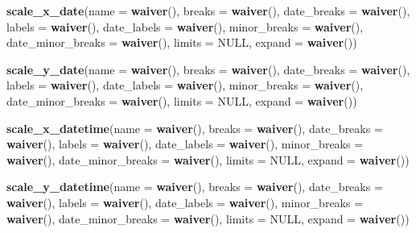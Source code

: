 \documentclass[]{book}
\newenvironment{Shaded}{\begin{snugshade}}{\end{snugshade}}
\newcommand{\KeywordTok}[1]{\textcolor[rgb]{0.13,0.29,0.53}{\textbf{#1}}}
\newcommand{\DataTypeTok}[1]{\textcolor[rgb]{0.13,0.29,0.53}{#1}}
\newcommand{\OtherTok}[1]{\textcolor[rgb]{0.56,0.35,0.01}{#1}}
\newcommand{\NormalTok}[1]{#1}
\begin{document}
\begin{Shaded}
\begin{Highlighting}[]
\KeywordTok{scale_x_date}\NormalTok{(}\DataTypeTok{name =} \KeywordTok{waiver}\NormalTok{(), }\DataTypeTok{breaks =} \KeywordTok{waiver}\NormalTok{(), }\DataTypeTok{date_breaks =} \KeywordTok{waiver}\NormalTok{(),}
             \DataTypeTok{labels =} \KeywordTok{waiver}\NormalTok{(), }\DataTypeTok{date_labels =} \KeywordTok{waiver}\NormalTok{(), }\DataTypeTok{minor_breaks =} \KeywordTok{waiver}\NormalTok{(),}
             \DataTypeTok{date_minor_breaks =} \KeywordTok{waiver}\NormalTok{(), }\DataTypeTok{limits =} \OtherTok{NULL}\NormalTok{, }\DataTypeTok{expand =} \KeywordTok{waiver}\NormalTok{())}

\KeywordTok{scale_y_date}\NormalTok{(}\DataTypeTok{name =} \KeywordTok{waiver}\NormalTok{(), }\DataTypeTok{breaks =} \KeywordTok{waiver}\NormalTok{(), }\DataTypeTok{date_breaks =} \KeywordTok{waiver}\NormalTok{(),}
             \DataTypeTok{labels =} \KeywordTok{waiver}\NormalTok{(), }\DataTypeTok{date_labels =} \KeywordTok{waiver}\NormalTok{(), }\DataTypeTok{minor_breaks =} \KeywordTok{waiver}\NormalTok{(),}
             \DataTypeTok{date_minor_breaks =} \KeywordTok{waiver}\NormalTok{(), }\DataTypeTok{limits =} \OtherTok{NULL}\NormalTok{, }\DataTypeTok{expand =} \KeywordTok{waiver}\NormalTok{())}

\KeywordTok{scale_x_datetime}\NormalTok{(}\DataTypeTok{name =} \KeywordTok{waiver}\NormalTok{(), }\DataTypeTok{breaks =} \KeywordTok{waiver}\NormalTok{(), }\DataTypeTok{date_breaks =} \KeywordTok{waiver}\NormalTok{(),}
                 \DataTypeTok{labels =} \KeywordTok{waiver}\NormalTok{(), }\DataTypeTok{date_labels =} \KeywordTok{waiver}\NormalTok{(), }\DataTypeTok{minor_breaks =} \KeywordTok{waiver}\NormalTok{(),}
                 \DataTypeTok{date_minor_breaks =} \KeywordTok{waiver}\NormalTok{(), }\DataTypeTok{limits =} \OtherTok{NULL}\NormalTok{, }\DataTypeTok{expand =} \KeywordTok{waiver}\NormalTok{())}

\KeywordTok{scale_y_datetime}\NormalTok{(}\DataTypeTok{name =} \KeywordTok{waiver}\NormalTok{(), }\DataTypeTok{breaks =} \KeywordTok{waiver}\NormalTok{(), }\DataTypeTok{date_breaks =} \KeywordTok{waiver}\NormalTok{(),}
                 \DataTypeTok{labels =} \KeywordTok{waiver}\NormalTok{(), }\DataTypeTok{date_labels =} \KeywordTok{waiver}\NormalTok{(), }\DataTypeTok{minor_breaks =} \KeywordTok{waiver}\NormalTok{(),}
                 \DataTypeTok{date_minor_breaks =} \KeywordTok{waiver}\NormalTok{(), }\DataTypeTok{limits =} \OtherTok{NULL}\NormalTok{, }\DataTypeTok{expand =} \KeywordTok{waiver}\NormalTok{())}
\end{Highlighting}
\end{Shaded}
\end{document}
